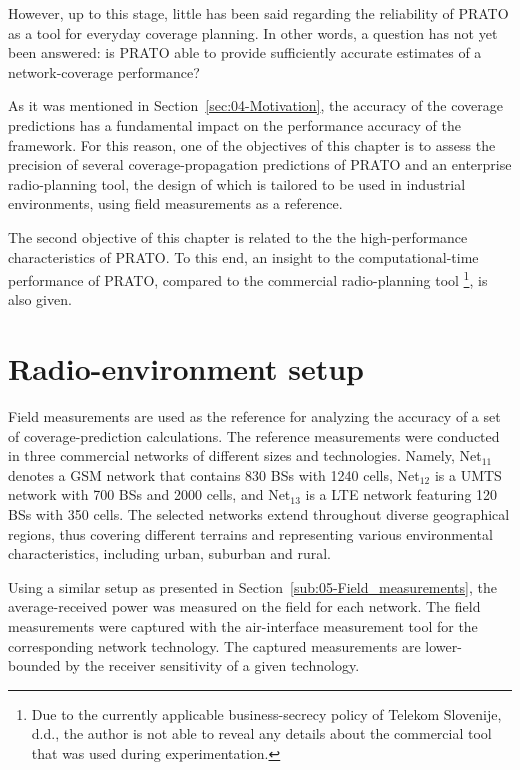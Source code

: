 However, up to this stage, little has been said regarding the reliability
of PRATO as a tool for everyday coverage planning. In other words,
a question has not yet been answered: is PRATO able to provide sufficiently
accurate estimates of a network-coverage performance?

As it was mentioned in Section~\ref{sec:04-Motivation}, the accuracy
of the coverage predictions has a fundamental impact on the performance
accuracy of the framework. For this reason, one of the objectives
of this chapter is to assess the precision of several coverage-propagation
predictions of PRATO and an enterprise radio-planning tool, the design
of which is tailored to be used in industrial environments, using
field measurements as a reference.

The second objective of this chapter is related to the the high-performance
characteristics of PRATO. To this end, an insight to the computational-time
performance of PRATO, compared to the commercial radio-planning tool%
\footnote{Due to the currently applicable business-secrecy policy of Telekom
Slovenije, d.d., the author is not able to reveal any details about
the commercial tool that was used during experimentation.%
}, is also given.


\section{Radio-environment setup \label{sec:08-Radio_environment_setup}}

Field measurements are used as the reference for analyzing the accuracy
of a set of coverage-prediction calculations. The reference measurements
were conducted in three commercial networks of different sizes and
technologies. Namely, Net$_{11}$ denotes a GSM network that contains
830 BSs with 1240 cells, Net$_{12}$ is a UMTS network with 700 BSs
and 2000 cells, and Net$_{13}$ is a LTE network featuring 120 BSs
with 350 cells. The selected networks extend throughout diverse geographical
regions, thus covering different terrains and representing various
environmental characteristics, including urban, suburban and rural.

Using a similar setup as presented in Section~\ref{sub:05-Field_measurements},
the average-received power was measured on the field for each network.
The field measurements were captured with the air-interface measurement
tool for the corresponding network technology. The captured measurements
are lower-bounded by the receiver sensitivity of a given technology.

